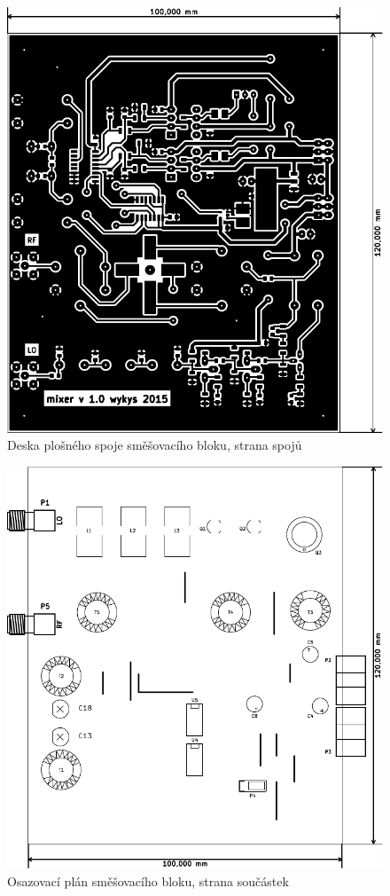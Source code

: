 \begin{figure}[H]
	\centering
	\includegraphics[width=170mm]{img/mix/cu_b.pdf}
	\caption{Deska plošného spoje směšovacího bloku, strana spojů}    		
\end{figure}

\begin{figure}[H]
	\centering
	\includegraphics[width=170mm]{img/mix/os_f.pdf}
	\caption{Osazovací plán směšovacího bloku, strana součástek}    		
\end{figure}

